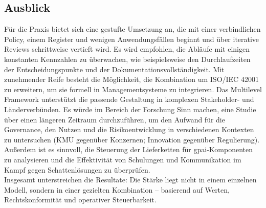 \subsection{Ausblick}
Für die Praxis bietet sich eine gestufte Umsetzung an, die mit einer verbindlichen Policy, einem Register und wenigen Anwendungsfällen beginnt und über iterative Reviews schrittweise vertieft wird.
Es wird empfohlen, die Abläufe mit einigen konstanten Kennzahlen zu überwachen, wie beispielsweise den Durchlaufzeiten der Entscheidungspunkte und der Dokumentationsvollständigkeit.
Mit zunehmender Reife besteht die Möglichkeit, die Kombination um ISO/IEC 42001 zu erweitern, um sie formell in Managementsysteme zu integrieren.
Das Multilevel Framework unterstützt die passende Gestaltung in komplexen Stakeholder- und Länderverbünden.
Es würde im Bereich der Forschung Sinn machen, eine Studie über einen längeren Zeitraum durchzuführen, um den Aufwand für die Governance, den Nutzen und die Risikoentwicklung in verschiedenen Kontexten zu untersuchen (KMU gegenüber Konzernen; Innovation gegenüber Regulierung).
Außerdem ist es sinnvoll, die Steuerung der Lieferketten für \ac{gpai}-Komponenten zu analysieren und die Effektivität von Schulungen und Kommunikation im Kampf gegen Schattenlösungen zu überprüfen.
\\
Insgesamt unterstreichen die Resultate: Die Stärke liegt nicht in einem einzelnen Modell, sondern in einer gezielten Kombination – basierend auf Werten, Rechtskonformität und operativer Steuerbarkeit.